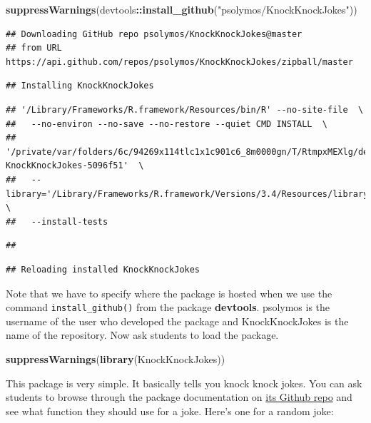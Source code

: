 \documentclass[]{book}
\newenvironment{Shaded}{\begin{snugshade}}{\end{snugshade}}
\newcommand{\KeywordTok}[1]{\textcolor[rgb]{0.13,0.29,0.53}{\textbf{#1}}}
\newcommand{\NormalTok}[1]{#1}
\newcommand{\OperatorTok}[1]{\textcolor[rgb]{0.81,0.36,0.00}{\textbf{#1}}}
\newcommand{\StringTok}[1]{\textcolor[rgb]{0.31,0.60,0.02}{#1}}
\begin{document}
\begin{Shaded}
\begin{Highlighting}[]
\KeywordTok{suppressWarnings}\NormalTok{(devtools}\OperatorTok{::}\KeywordTok{install_github}\NormalTok{(}\StringTok{"psolymos/KnockKnockJokes"}\NormalTok{))}
\end{Highlighting}
\end{Shaded}

\begin{verbatim}
## Downloading GitHub repo psolymos/KnockKnockJokes@master
## from URL https://api.github.com/repos/psolymos/KnockKnockJokes/zipball/master
\end{verbatim}

\begin{verbatim}
## Installing KnockKnockJokes
\end{verbatim}

\begin{verbatim}
## '/Library/Frameworks/R.framework/Resources/bin/R' --no-site-file  \
##   --no-environ --no-save --no-restore --quiet CMD INSTALL  \
##   '/private/var/folders/6c/94269x114tlc1x1c901c6_8m0000gn/T/RtmpxMEXlg/devtools10d317a7661af/psolymos-KnockKnockJokes-5096f51'  \
##   --library='/Library/Frameworks/R.framework/Versions/3.4/Resources/library'  \
##   --install-tests
\end{verbatim}

\begin{verbatim}
## 
\end{verbatim}

\begin{verbatim}
## Reloading installed KnockKnockJokes
\end{verbatim}

Note that we have to specify where the package is hosted when we use the command \texttt{install\_github()} from the package \textbf{devtools}. psolymos is the username of the user who developed the package and KnockKnockJokes is the name of the repository. Now ask students to load the package.

\begin{Shaded}
\begin{Highlighting}[]
\KeywordTok{suppressWarnings}\NormalTok{(}\KeywordTok{library}\NormalTok{(KnockKnockJokes))}
\end{Highlighting}
\end{Shaded}

This package is very simple. It basically tells you knock knock jokes. You can ask students to browse through the package documentation on \href{https://github.com/psolymos/KnockKnockJokes}{its Github repo} and see what function they should use for a joke. Here's one for a random joke:
\end{document}
